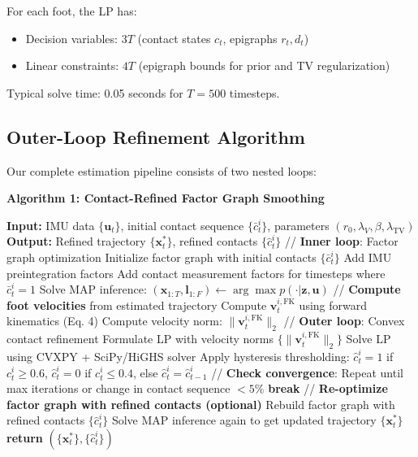 \documentclass[conference]{IEEEtran}
\begin{document}
For each foot, the LP has:
\begin{itemize}
\item Decision variables: $3T$ (contact states $c_t$, epigraphs $r_t, d_t$)
\item Linear constraints: $4T$ (epigraph bounds for prior and TV regularization)
\end{itemize}

Typical solve time: 0.05 seconds for $T = 500$ timesteps.

\subsection{Outer-Loop Refinement Algorithm}
Our complete estimation pipeline consists of two nested loops:

\textbf{Algorithm 1: Contact-Refined Factor Graph Smoothing}
\begin{algorithmic}
\STATE \textbf{Input:} IMU data $\{\mathbf{u}_t\}$, initial contact sequence $\{\bar{c}_t^i\}$, parameters $(r_0, \lambda_V, \beta, \lambda_{\text{TV}})$
\STATE \textbf{Output:} Refined trajectory $\{\mathbf{x}_t^*\}$, refined contacts $\{\hat{c}_t^i\}$
\STATE
\STATE // \textbf{Inner loop}: Factor graph optimization
\STATE Initialize factor graph with initial contacts $\{\bar{c}_t^i\}$
\STATE Add IMU preintegration factors
\STATE Add contact measurement factors for timesteps where $\bar{c}_t^i = 1$
\STATE Solve MAP inference: $(\mathbf{x}_{1:T}, \mathbf{l}_{1:F}) \leftarrow \arg\max p(\cdot | \mathbf{z}, \mathbf{u})$
\STATE
\STATE // \textbf{Compute foot velocities} from estimated trajectory
        \STATE Compute $\mathbf{v}_t^{i,\text{FK}}$ using forward kinematics (Eq. 4)
        \STATE Compute velocity norm: $\|\mathbf{v}_t^{i,\text{FK}}\|_2$
    \ENDFOR
\ENDFOR
\STATE
\STATE // \textbf{Outer loop}: Convex contact refinement
    \STATE Formulate LP with velocity norms $\{\|\mathbf{v}_t^{i,\text{FK}}\|_2\}$
    \STATE Solve LP using CVXPY + SciPy/HiGHS solver
    \STATE Apply hysteresis thresholding: $\hat{c}_t^i = 1$ if $c_t^i \geq 0.6$, $\hat{c}_t^i = 0$ if $c_t^i \leq 0.4$, else $\hat{c}_t^i = \hat{c}_{t-1}^i$
\ENDFOR
\STATE
\STATE // \textbf{Check convergence}: Repeat until max iterations or change in contact sequence $< 5\%$
    \STATE \textbf{break}
\ENDIF
\STATE // \textbf{Re-optimize factor graph with refined contacts (optional)}
\STATE Rebuild factor graph with refined contacts $\{\hat{c}_t^i\}$
\STATE Solve MAP inference again to get updated trajectory $\{\mathbf{x}_t^*\}$
\STATE
\STATE \textbf{return} $(\{\mathbf{x}_t^*\}, \{\hat{c}_t^i\})$
\end{algorithmic}
\end{document}
